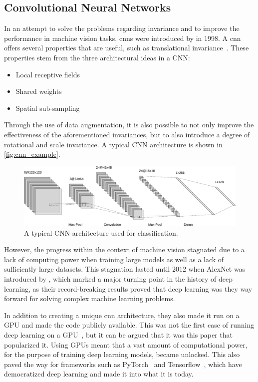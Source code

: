 \subsection{Convolutional Neural Networks}
In an attempt to solve the problems regarding invariance and to improve the performance in machine vision tasks, \glspl*{cnn} were introduced by \textcite{cnn} in 1998. A \gls*{cnn} offers several properties that are useful, such as translational invariance~\cite{cnn}. These properties stem from the three architectural ideas in a CNN:
\begin{itemize}
    \item Local receptive fields
    \item Shared weights
    \item Spatial sub-sampling
\end{itemize}
Through the use of data augmentation, it is also possible to not only improve the effectiveness of the aforementioned invariances, but to also introduce a degree of rotational and scale invariance. A typical CNN architecture is shown in \autoref{fig:cnn_example}.
\begin{figure}[htb]
    \centering
    \includegraphics[width=\linewidth]{resources/related_works/cnn}
    \caption[Typical CNN Architecture]{ A typical CNN architecture used for classification. }
    \label{fig:cnn_example}
\end{figure}
\par
However, the progress within the context of machine vision stagnated due to a lack of computing power when training large models as well as a lack of sufficiently large datasets. This stagnation lasted until 2012 when AlexNet was introduced by \textcite{alexnet}, which marked a major turning point in the history of deep learning, as their record-breaking results proved that deep learning was they way forward for solving complex machine learning problems.
\par
In addition to creating a unique \gls*{cnn} architecture, they also made it run on a GPU and made the code publicly available. This was not the first case of running deep learning on a GPU~\cite{deeplearning_gpu}, but it can be argued that it was this paper that popularized it.  Using GPUs meant that a vast amount of computational power, for the purpose of training deep learning models, became unlocked. This also paved the way for frameworks such as PyTorch~\cite{pytorch} and Tensorflow~\cite{tensorflow}, which have democratized deep learning and made it into what it is today.
